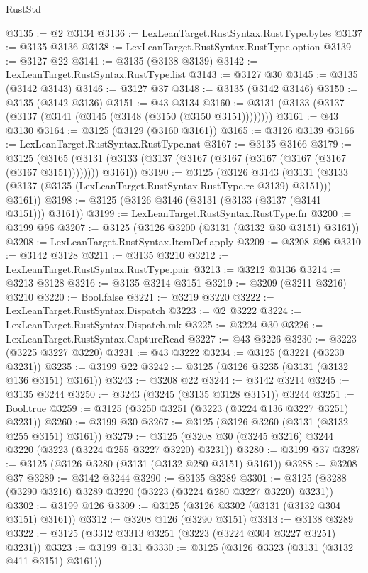 \begin{lexlean}{RustStd}
\begin{coremodule}
@3135 := @2 @3134
@3136 := LexLeanTarget.RustSyntax.RustType.bytes
@3137 := @3135 @3136
@3138 := LexLeanTarget.RustSyntax.RustType.option
@3139 := @3127 @22
@3141 := @3135 (@3138 @3139)
@3142 := LexLeanTarget.RustSyntax.RustType.list
@3143 := @3127 @30
@3145 := @3135 (@3142 @3143)
@3146 := @3127 @37
@3148 := @3135 (@3142 @3146)
@3150 := @3135 (@3142 @3136)
@3151 := @43 @3134
@3160 := @3131 (@3133 (@3137 (@3137 (@3141 (@3145 (@3148 (@3150 (@3150 @3151))))))))
@3161 := @43 @3130
@3164 := @3125 (@3129 (@3160 @3161))
@3165 := @3126 @3139
@3166 := LexLeanTarget.RustSyntax.RustType.nat
@3167 := @3135 @3166
@3179 := @3125
    (@3165 (@3131 (@3133 (@3137 (@3167 (@3167 (@3167 (@3167 (@3167 (@3167 @3151)))))))) @3161))
@3190 := @3125
    (@3126
      @3143
      (@3131 (@3133 (@3137 (@3135 (LexLeanTarget.RustSyntax.RustType.rc @3139) @3151))) @3161))
@3198 := @3125 (@3126 @3146 (@3131 (@3133 (@3137 (@3141 @3151))) @3161))
@3199 := LexLeanTarget.RustSyntax.RustType.fn
@3200 := @3199 @96
@3207 := @3125 (@3126 @3200 (@3131 (@3132 @30 @3151) @3161))
@3208 := LexLeanTarget.RustSyntax.ItemDef.apply
@3209 := @3208 @96
@3210 := @3142 @3128
@3211 := @3135 @3210
@3212 := LexLeanTarget.RustSyntax.RustType.pair
@3213 := @3212 @3136
@3214 := @3213 @3128
@3216 := @3135 @3214 @3151
@3219 := @3209 (@3211 @3216) @3210
@3220 := Bool.false
@3221 := @3219 @3220
@3222 := LexLeanTarget.RustSyntax.Dispatch
@3223 := @2 @3222
@3224 := LexLeanTarget.RustSyntax.Dispatch.mk
@3225 := @3224 @30
@3226 := LexLeanTarget.RustSyntax.CaptureRead
@3227 := @43 @3226
@3230 := @3223 (@3225 @3227 @3220)
@3231 := @43 @3222
@3234 := @3125 (@3221 (@3230 @3231))
@3235 := @3199 @22
@3242 := @3125 (@3126 @3235 (@3131 (@3132 @136 @3151) @3161))
@3243 := @3208 @22
@3244 := @3142 @3214
@3245 := @3135 @3244
@3250 := @3243 (@3245 (@3135 @3128 @3151)) @3244
@3251 := Bool.true
@3259 := @3125 (@3250 @3251 (@3223 (@3224 @136 @3227 @3251) @3231))
@3260 := @3199 @30
@3267 := @3125 (@3126 @3260 (@3131 (@3132 @255 @3151) @3161))
@3279 := @3125 (@3208 @30 (@3245 @3216) @3244 @3220 (@3223 (@3224 @255 @3227 @3220) @3231))
@3280 := @3199 @37
@3287 := @3125 (@3126 @3280 (@3131 (@3132 @280 @3151) @3161))
@3288 := @3208 @37
@3289 := @3142 @3244
@3290 := @3135 @3289
@3301 := @3125 (@3288 (@3290 @3216) @3289 @3220 (@3223 (@3224 @280 @3227 @3220) @3231))
@3302 := @3199 @126
@3309 := @3125 (@3126 @3302 (@3131 (@3132 @304 @3151) @3161))
@3312 := @3208 @126 (@3290 @3151)
@3313 := @3138 @3289
@3322 := @3125 (@3312 @3313 @3251 (@3223 (@3224 @304 @3227 @3251) @3231))
@3323 := @3199 @131
@3330 := @3125 (@3126 @3323 (@3131 (@3132 @411 @3151) @3161))

\end{coremodule}
\end{lexlean}

